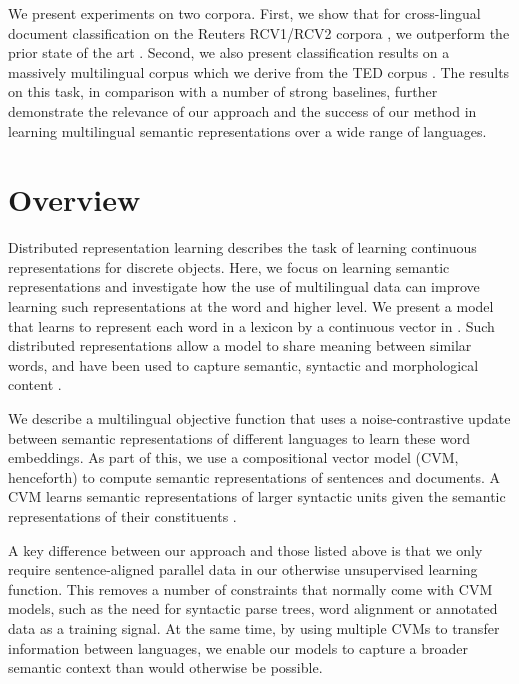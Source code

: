 \documentclass[11pt]{article}
\newcommand{\CVM}{\textsc{CVM}\xspace}
\begin{document}
We present experiments on two corpora.  First, we show that for cross-lingual
document classification on the Reuters RCV1/RCV2 corpora \cite{Lewis:2004}, we
outperform the prior state of the art \cite{Klementiev:2012}. Second, we also
present classification results on a massively multilingual corpus which we
derive from the TED corpus \cite{Cettolo:2012}. The results on this task, in
comparison with a number of strong baselines, further demonstrate the relevance
of our approach and the success of our method in learning multilingual semantic
representations over a wide range of languages.
 \section{Overview}

Distributed representation learning describes the task of learning continuous
representations for discrete objects.  Here, we focus on learning semantic
representations and investigate how the use of multilingual data can improve
learning such representations at the word and higher level.  We
present a model that learns to represent each word in a lexicon by a continuous
vector in .  Such distributed representations allow a model to
share meaning between similar words, and have been used to capture semantic,
syntactic and morphological content \cite[\textit{inter
    alia}]{Collobert:2008,Turian:2010}.

We describe a multilingual objective function that uses a noise-contrastive
update between semantic representations of different languages to learn these
word embeddings. As part of this, we use a compositional vector model (\CVM,
  henceforth) to compute semantic representations of sentences and documents. A
\CVM learns semantic representations of larger syntactic units given the
semantic representations of their constituents \cite[\textit{inter
    alia}]{Clark:2007a,Mitchell:2008,Baroni:2010,Grefenstette:2011,Socher:2012,Hermann:2013:ACL}.

A key difference between our approach and those listed above is that we only
require sentence-aligned parallel data in our otherwise unsupervised learning
function. This removes a number of constraints that normally come with \CVM
models, such as the need for syntactic parse trees, word alignment or annotated
data as a training signal. At the same time, by using multiple \CVM{s} to transfer
information between languages, we enable our models to capture a broader
semantic context than would otherwise be possible.
\end{document}
